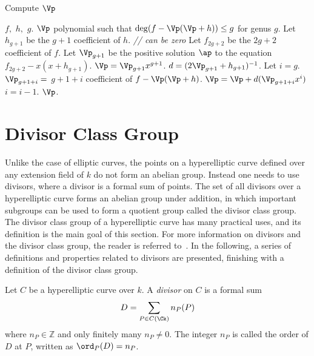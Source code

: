 \begin{algorithm}[ht]
  \caption{Compute $\Vp$}
  \label{alg:vp}
  {\fontsize{12}{18}\selectfont
  \begin{algorithmic}[1]
  \Require $f,$ $h,$ $g.$
  \Ensure $\Vp$ polynomial such that $\deg(f -\Vp(\Vp + h)) \leq g$ for genus $g$.
  \vspace{5pt}
  \State Let $h_{g+1}$ be the $g+1$ coefficient of $h$. \hspace{150pt} \emph{// can be zero}
  \State Let $f_{2g+2}$ be the $2g +2$ coefficient of $f$. 
  \State Let $\Vp_{g+1}$ be the positive solution $\ap$ to the equation $f_{2g+2} - x(x + h_{g+1})$.
  \State $\Vp = \Vp_{g+1}x^{g+1}$.
  \State $d = (2\Vp_{g+1} + h_{g+1})^{-1}$.
  \State Let $i = g$.
    \State $\Vp_{g+1+i} =$ $g+ 1 + i$ coefficient of $f - \Vp(\Vp + h)$.
    \State $\Vp = \Vp + d(\Vp_{g+1+i}x^i)$
    \State $i = i - 1$.
  \EndWhile
  \State \Return $\Vp$.
  \end{algorithmic}
  }
\end{algorithm}

\newpage


\section{Divisor Class Group}\label{sec:dcg}
Unlike the case of elliptic curves, the points on a hyperelliptic curve defined
over any extension field of $k$ do not form an abelian group. Instead one needs
to use divisors, where a divisor is a formal sum of points. The set of all
divisors over a hyperelliptic curve forms an abelian group under addition, in
which important subgroups can be used to form a quotient group called the
divisor class group. The divisor class group of a hyperelliptic curve has many
practical uses, and its definition is the main goal of this section. For more
information on divisors and the divisor class group, the reader is referred
to~\cite[Section~7.6]{Galbraith_PKC_2012}. In the following, a series of
definitions and properties related to divisors are presented, finishing with a
definition of the divisor class group.


\bd
\cite[Adapted from Definition~7.6.1]{Galbraith_PKC_2012} Let $C$ be a
hyperelliptic curve over $k$. A \emph{divisor} on $C$ is a formal sum 
\begin{equation}\label{eq:divisor}
  D = \sum_{P \in C(\Ck)} n_P(P)
\end{equation}
where $n_P \in \mathbb{Z}$ and only finitely many $n_P \neq 0$. The integer
$n_P$ is called the order of $D$ at $P$, written as $\ord_P(D) = n_P$.
\ed

